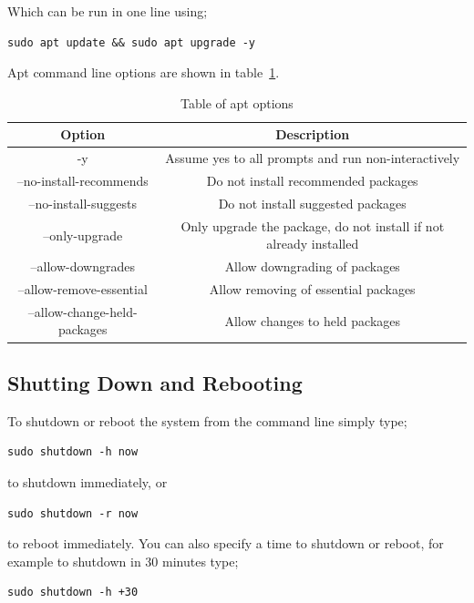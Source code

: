 Which can be run in one line using;

\begin{lstlisting}
sudo apt update && sudo apt upgrade -y 
\end{lstlisting}

Apt command line options are shown in table~\ref{tab:apt}.

\begin{table}[!th]
\centering
\begin{tabular}{cc}
\hline
Option & Description\\
\hline
-y & Assume yes to all prompts and run non-interactively\\
--no-install-recommends & Do not install recommended packages\\
--no-install-suggests & Do not install suggested packages\\
--only-upgrade & Only upgrade the package, do not install if not already installed\\
--allow-downgrades & Allow downgrading of packages\\
--allow-remove-essential & Allow removing of essential packages\\
--allow-change-held-packages & Allow changes to held packages\\
\hline
\end{tabular}
\caption{Table of apt options}
\label{tab:apt}
\end{table}

\subsection{Shutting Down and Rebooting}
\label{ssec:shutdown}

To shutdown or reboot the system from the command line simply type;

\begin{lstlisting}
sudo shutdown -h now
\end{lstlisting}

to shutdown immediately, or

\begin{lstlisting}
sudo shutdown -r now
\end{lstlisting}

to reboot immediately.  You can also specify a time to shutdown or reboot, for example to shutdown in 30 minutes type;

\begin{lstlisting}
sudo shutdown -h +30
\end{lstlisting}

